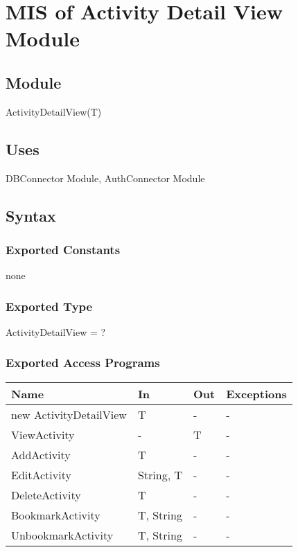 \documentclass[12pt, titlepage]{article}
\begin{document}
\newpage

\section{MIS of Activity Detail View Module} \label{mADV}

\subsection{Module}

ActivityDetailView(T)

\subsection{Uses}

DBConnector Module,  AuthConnector Module

\subsection{Syntax}

\subsubsection{Exported Constants}
none
\subsubsection{Exported Type}
ActivityDetailView = ?

\subsubsection{Exported Access Programs}
\begin{center}
\begin{tabular}{p{4cm} p{2cm} p{4cm} p{4cm}}
\hline
\textbf{Name} & \textbf{In} & \textbf{Out} & \textbf{Exceptions} \\
\hline
new ActivityDetailView & T & - & - \\
ViewActivity & - & T & -\\ 
AddActivity & T & - & - \\
EditActivity & String, T & - & - \\
DeleteActivity & T & - & - \\
BookmarkActivity & T, String & - & - \\
UnbookmarkActivity & T, String & - & - \\
\hline
\end{tabular}
\end{center}
\end{document}
